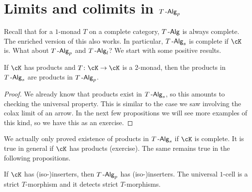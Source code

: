 \documentclass[a4paper,11pt,oneside,openany]{scrbook}
\begin{document}
\section{Limits and colimits in \texorpdfstring{$T\operatorname{-\mathsf{Alg}}_p$}{T-Alg_p}}
Recall that for a $1$-monad $T$ on a complete category, $T\operatorname{-\mathsf{Alg}}$ is always complete. The enriched version of this also works. In particular, $T\operatorname{-\mathsf{Alg}}_s$ is complete if $\cK$ is. What about $T\operatorname{-\mathsf{Alg}}_p$ and $T\operatorname{-\mathsf{Alg}}_l$?
We start with some positive results.
\begin{prop}
    If $\cK$ has products and $T\colon\cK\to\cK$ is a $2$-monad, then the products in $T\operatorname{-\mathsf{Alg}}_s$ are products in $T\operatorname{-\mathsf{Alg}}_p$. 
\end{prop}
\begin{proof}
    We already know that products exist in $T\operatorname{-\mathsf{Alg}}_s$, so this amounts to checking the universal property. This is similar to the case we saw involving the colax limit of an arrow. In the next few propositions we will see more examples of this kind, so we have this as an exercise. 
\end{proof}
\begin{rmk}
We actually only proved existence of products in $T\operatorname{-\mathsf{Alg}}_s$ if $\cK$ is complete. It is true in general if $\cK$ has products (exercise). The same remains true in the following propositions.
\end{rmk}
\begin{prop}
    If $\cK$ has (iso-)inserters, then $T\operatorname{-\mathsf{Alg}}_p$ has (iso-)inserters. The universal $1$-cell is a strict $T$-morphism and it detects strict $T$-morphisms. 
\end{prop}
\end{document}
